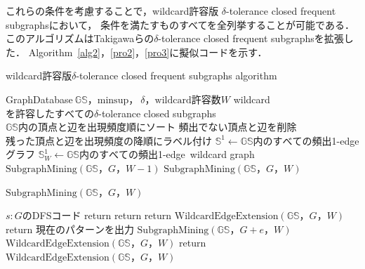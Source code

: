 \documentclass[12pt,fleqn]{jsotsuron}
\begin{document}
これらの条件を考慮することで，wildcard許容版
$\delta$-tolerance closed frequent subgraphsにおいて，
条件を満たすものすべてを全列挙することが可能である．
このアルゴリズムはTakigawaらの$\delta$-tolerance closed frequent subgraphsを拡張した．
Algorithm~\ref{alg2}，\ref{pro2}，\ref{pro3}に擬似コードを示す．

\begin{algorithm} [t]
\caption{wildcard許容版$\delta$-tolerance closed frequent subgraphs algorithm}         
\label{alg2}                          
\begin{algorithmic} [1] 
\REQUIRE GraphDatabase$\ \mathbb{GS}，\mathrm{minsup}，\ \delta，\mathrm{wildcard}許容数W$
\ENSURE wildcard$を許容したすべての\delta$-tolerance closed subgraphs
\STATE $\mathbb{GS}内の頂点と辺を出現頻度順にソート$
\STATE $頻出でない頂点と辺を削除$
\STATE $残った頂点と辺を出現頻度の降順にラベル付け$
\STATE $\mathbb{S}^1\leftarrow\mathbb{GS}内のすべての頻出$1-edgeグラフ
\STATE $\mathbb{S}^1_W\leftarrow\mathbb{GS}内のすべての頻出$1-edge\ wildcard graph
\STATE $\mathrm{SubgraphMining}(\mathbb{GS}，G，W-1)$
\STATE $\mathrm{SubgraphMining}(\mathbb{GS}，G，W)$
\ENDIF
\ENDFOR
\end{algorithmic}
\end{algorithm}
\begin{algorithm}[t]
\caption{$\mathrm{SubgraphMining}(\mathbb{GS}，G，W)$}         
\label{pro2}                          
\begin{algorithmic} [1] 
\STATE $s:G$のDFSコード
\STATE return
\ENDIF
{}
\STATE return
\ENDIF
{}
\STATE return
\ENDIF
{}
\STATE $\mathrm{WildcardEdgeExtension}(\mathbb{GS}，G，W)$
\STATE return
\ENDIF
{}
\STATE $現在のパターンを出力$
\ENDIF
{}
\STATE $\mathrm{SubgraphMining}(\mathbb{GS}，G+e，W)$
\STATE $\mathrm{WildcardEdgeExtension}(\mathbb{GS}，G，W)$
\STATE return
\ENDIF
\ENDFOR
\STATE $\mathrm{WildcardEdgeExtension}(\mathbb{GS}，G，W)$
\end{algorithmic}
\end{algorithm}
\end{document}
